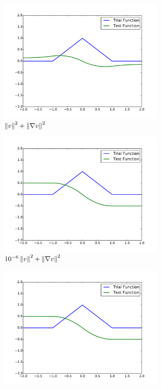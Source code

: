 \documentclass{article}
\begin{document}
\begin{figure}[ht]
\centering
\begin{subfigure}[t]{0.45\textwidth}
\centering
\includegraphics[width=0.9\textwidth]{OptimalTestFunctions/SpecialCases/ConvectionH1NoBC.pdf}
\caption{$\left\| v \right\|^2+\left\| \nabla v \right\|^2$}
\end{subfigure}
\begin{subfigure}[t]{0.45\textwidth}
\centering
\includegraphics[width=0.9\textwidth]{OptimalTestFunctions/SpecialCases/Convection1e-6NoBC.pdf}
\caption{$10^{-6}\left\| v \right\|^2+\left\| \nabla v \right\|^2$}
\end{subfigure}
\begin{subfigure}[t]{0.45\textwidth}
\centering
\includegraphics[width=0.9\textwidth]{OptimalTestFunctions/SpecialCases/ConvectionGradBC.pdf}

\end{subfigure}
\end{figure}
\end{document}
